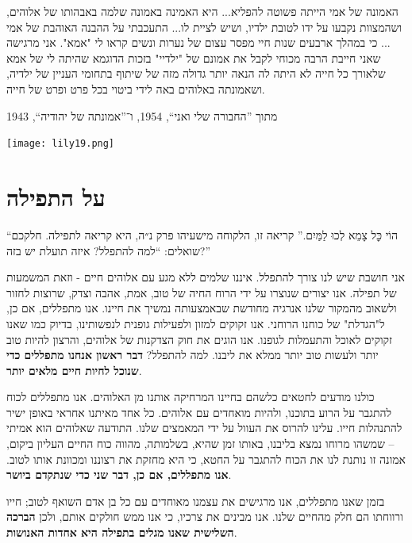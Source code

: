 \documentclass[14pt, article, extrafontsizes, twopage, a4paper]{memoir}
\newcommand{\attr}[1]{
{\raggedright\smaller#1}
}
\begin{document}
האמונה של אמי הייתה פשוטה להפליא... היא האמינה באמונה שלמה באבהותו של אלוהים, ושהמצוות נקבעו על ידו לטובת ילדיו, ושיש לציית לו... התעכבתי על ההבנה האוהבת של אמי ... כי במהלך ארבעים שנות חיי מפסר עצום של נערות ונשים קראו לי "אמא". אני מרגישה שאני חייבת הרבה מכוחי לקבל את אמונם של "ילדיי" בזכות הדוגמא שהיתה לי של אמא שלאורך כל חייה לא היתה לה הנאה יותר גדולה מזה של שיתוף בתחומי העניין של ילדיה, ושאמונתה באלוהים באה לידי ביטוי בכל פרט ופרט של חייה.

\attr{מתוך ”החבורה שלי ואני“, 1954, ו־”אמונתה של יהודיה“, 1943}

{
  \centering
\vspace*{.5\baselineskip}
\texttt{[image: lily19.png]}\\
\vspace*{.5\baselineskip}

}

\chapter{על התפילה}

``הוֹי כׇּל צָמֵא לְכוּ לַמַּיִם.''
קריאה זו, הלקוחה מישעיהו פרק נ״ה, היא קריאה לתפילה. חלקכם שואלים: ``למה להתפלל? איזה תועלת יש בזה?''

אני חושבת שיש לנו צורך להתפלל. איננו שלמים ללא מגע עם אלוהים חיים - וזאת המשמעות של תפילה. אנו יצורים שנוצרו על ידי הרוח החיה של טוב, אמת, אהבה וצדק, שרוצות לחזור ולשאוב מהמקור שלנו אנרגיה מחודשת שבאמצעותה נמשיך את חיינו. אנו מתפללים, אם כן, ל"הגדלת" של כוחנו הרוחני. אנו זקוקים למזון ולפעילות גופנית לנפשותינו, בדיוק כמו שאנו זקוקים לאוכל והתעמלות לגופנו. אנו הוגים את חוק הצדקנות של אלוהים, והרצון להיות טוב יותר ולעשות טוב יותר ממלא את ליבנו. למה להתפלל? \textbf{דבר ראשון אנחנו מתפללים כדי שנוכל לחיות חיים מלאים יותר}.

כולנו מודעים לחטאים כלשהם בחיינו המרחיקה אותנו מן האלוהים. אנו מתפללים לכוח להתגבר על הרוע בתוכנו, ולהיות מואחדים עם אלוהים. כל אחד מאיתנו אחראי באופן ישיר להתנהלות חייו. עלינו להרוס את העוול על ידי המאמצים שלנו. התודעה שאלוהים הוא אמיתי -- שמשהו מרוחו נמצא בליבנו, באותו זמן שהיא, בשלמותה, מהווה כוח החיים העליון ביקום, אמונה זו נותנת לנו את הכוח להתגבר על החטא, כי היא מחזקת את רצוננו ומכוונת אותו לטוב. \textbf{אנו מתפללים, אם כן, דבר שני כדי שנתקדם ביושר}.

בזמן שאנו מתפללים, אנו מרגישים את עצמנו מאוחדים עם כל בן אדם השואף לטוב; חייו ורווחתו הם חלק מהחיים שלנו. אנו מבינים את צרכיו, כי אנו ממש חולקים אותם, ולכן \textbf{הברכה השלישית שאנו מגלים בתפילה היא אחדות האנושות}.
\end{document}

